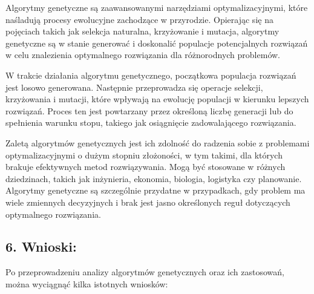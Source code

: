\documentclass[11pt]{article}
\begin{document}
Algorytmy genetyczne są zaawansowanymi narzędziami optymalizacyjnymi,
które naśladują procesy ewolucyjne zachodzące w przyrodzie. Opierając
się na pojęciach takich jak selekcja naturalna, krzyżowanie i mutacja,
algorytmy genetyczne są w stanie generować i doskonalić populacje
potencjalnych rozwiązań w celu znalezienia optymalnego rozwiązania dla
różnorodnych problemów.

W trakcie działania algorytmu genetycznego, początkowa populacja
rozwiązań jest losowo generowana. Następnie przeprowadza się operacje
selekcji, krzyżowania i mutacji, które wpływają na ewolucję populacji w
kierunku lepszych rozwiązań. Proces ten jest powtarzany przez określoną
liczbę generacji lub do spełnienia warunku stopu, takiego jak
osiągnięcie zadowalającego rozwiązania.

Zaletą algorytmów genetycznych jest ich zdolność do radzenia sobie z
problemami optymalizacyjnymi o dużym stopniu złożoności, w tym takimi,
dla których brakuje efektywnych metod rozwiązywania. Mogą być stosowane
w różnych dziedzinach, takich jak inżynieria, ekonomia, biologia,
logistyka czy planowanie. Algorytmy genetyczne są szczególnie przydatne
w przypadkach, gdy problem ma wiele zmiennych decyzyjnych i brak jest
jasno określonych reguł dotyczących optymalnego rozwiązania.

\hypertarget{wnioski}{%
\subsection{6. Wnioski:}\label{wnioski}}

Po przeprowadzeniu analizy algorytmów genetycznych oraz ich zastosowań,
można wyciągnąć kilka istotnych wniosków:
\end{document}

